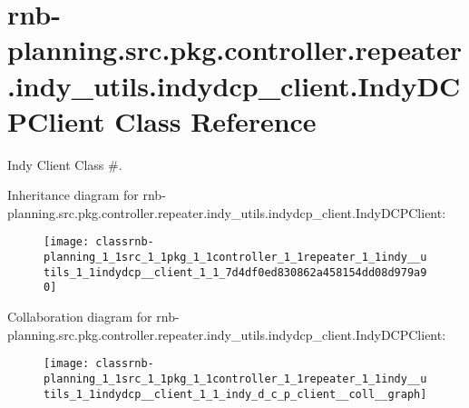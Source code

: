 \hypertarget{classrnb-planning_1_1src_1_1pkg_1_1controller_1_1repeater_1_1indy__utils_1_1indydcp__client_1_1_indy_d_c_p_client}{}\section{rnb-\/planning.src.\+pkg.\+controller.\+repeater.\+indy\+\_\+utils.\+indydcp\+\_\+client.\+Indy\+D\+C\+P\+Client Class Reference}
\label{classrnb-planning_1_1src_1_1pkg_1_1controller_1_1repeater_1_1indy__utils_1_1indydcp__client_1_1_indy_d_c_p_client}


Indy Client Class \#.  




Inheritance diagram for rnb-\/planning.src.\+pkg.\+controller.\+repeater.\+indy\+\_\+utils.\+indydcp\+\_\+client.\+Indy\+D\+C\+P\+Client\+:\nopagebreak
\begin{figure}[H]
\begin{center}
\leavevmode
\texttt{[image: classrnb-planning\_1\_1src\_1\_1pkg\_1\_1controller\_1\_1repeater\_1\_1indy\_\_utils\_1\_1indydcp\_\_client\_1\_1\_7d4df0ed830862a458154dd08d979a90]}
\end{center}
\end{figure}


Collaboration diagram for rnb-\/planning.src.\+pkg.\+controller.\+repeater.\+indy\+\_\+utils.\+indydcp\+\_\+client.\+Indy\+D\+C\+P\+Client\+:\nopagebreak
\begin{figure}[H]
\begin{center}
\leavevmode
\texttt{[image: classrnb-planning\_1\_1src\_1\_1pkg\_1\_1controller\_1\_1repeater\_1\_1indy\_\_utils\_1\_1indydcp\_\_client\_1\_1\_indy\_d\_c\_p\_client\_\_coll\_\_graph]}
\end{center}
\end{figure}
